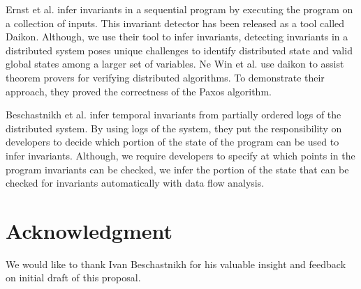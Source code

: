 Ernst et al.\cite{ernst2001dynamically} infer invariants in a
sequential program by executing the program on a collection of inputs.
This invariant detector has been released as a tool called
Daikon\cite{ernst2007daikon}. Although, we use their tool to infer
invariants, detecting invariants in a distributed system poses unique
challenges to identify distributed state and valid global states among
a larger set of variables. Ne Win et al.\cite{NeWinEGKL04} use daikon
to assist theorem provers for verifying distributed algorithms. To
demonstrate their approach, they proved the correctness of the Paxos
algorithm.

Beschastnikh et al. \cite{temporalInv} infer temporal invariants from partially ordered logs of the distributed system. By using logs of the system, they put the responsibility on developers to decide which portion of the state of the program can be used to infer invariants. Although, we require developers to specify at which points in the program invariants can be checked, we infer the portion of the state that can be checked for invariants automatically with data flow analysis.


\section{Acknowledgment}
We would like to thank Ivan Beschastnikh for his valuable insight and feedback on initial draft of this proposal.